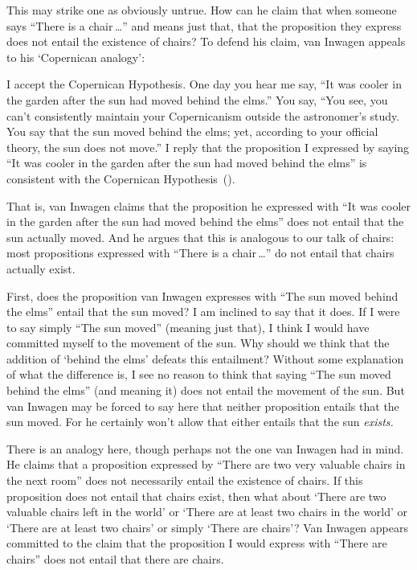\documentclass[11pt]{article}
\newenvironment{squote}{%
	\begin{spacing}{1}
	\begin{list}{}{%
	\setlength{\labelwidth}{0pt}%
	\rightmargin\leftmargin%
	}
	\item\relax
	}{%
	\end{list}%
	\end{spacing}
	}
\begin{document}
\begin{spacing}{1.5}
This may strike one as obviously untrue.  How can he claim that when
someone says ``There is a chair\,\ldots '' and means just that, that
the proposition they express does not entail the existence of chairs? 
To defend his claim, van Inwagen appeals to his `Copernican analogy':
\begin{squote}
I accept the Copernican Hypothesis.  One day you hear me say, ``It was
cooler in the garden after the sun had moved behind the elms.'' You
say, ``You see, you can't consistently maintain your Copernicanism
outside the astronomer's study.  You say that the sun moved behind the
elms; yet, according to your official theory, the sun does not move.''
I reply that the proposition I expressed by saying ``It was cooler in
the garden after the sun had moved behind the elms'' is consistent
with the Copernican Hypothesis~(\citeyear[101]{inwagen1995}).
\end{squote}
That is, van Inwagen claims that the proposition he expressed with
``It was cooler in the garden after the sun had moved behind the
elms'' does not entail that the sun actually moved.  And he argues
that this is analogous to our talk of chairs: most propositions
expressed with ``There is a chair\,\ldots '' do not entail that chairs
actually exist.

First, does the proposition van Inwagen expresses with ``The sun moved
behind the elms'' entail that the sun moved? I am inclined to say that
it does.  If I were to say simply ``The sun moved'' (meaning just
that), I think I would have committed myself to the movement of the
sun.  Why should we think that the addition of `behind the elms'
defeats this entailment?  Without some explanation of what the
difference is, I see no reason to think that saying ``The sun moved
behind the elms'' (and meaning it) does not entail the movement of the
sun.  But van Inwagen may be forced to say here that neither
proposition entails that the sun moved.  For he certainly won't allow
that either entails that the sun {\em exists.}

There is an analogy here, though perhaps not the one van Inwagen had
in mind.  He claims that a proposition expressed by ``There are two
very valuable chairs in the next room'' does not necessarily entail
the existence of chairs.  If this proposition does not entail that
chairs exist, then what about `There are two valuable chairs left in
the world' or `There are at least two chairs in the world' or `There
are at least two chairs' or simply `There are chairs'?  Van Inwagen
appears committed to the claim that the proposition I would express
with ``There are chairs'' does not entail that there are chairs.


\end{spacing}
\end{document}
